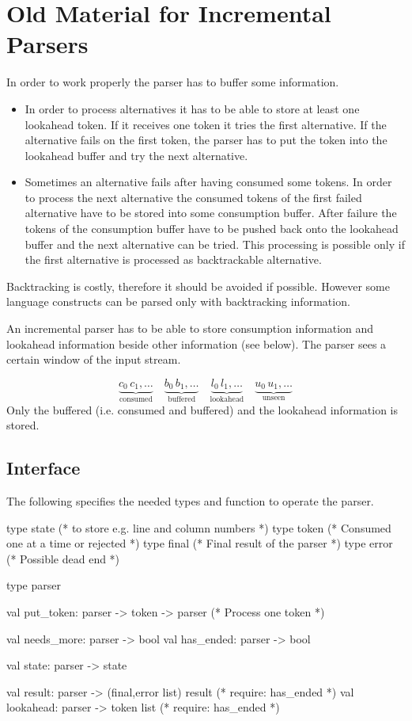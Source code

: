 \section{Old Material for Incremental Parsers}


In order to work properly the parser has to buffer some information.
\begin{itemize}

\item In order to process alternatives it has to be able to store at least one
  lookahead token. If it receives one token it tries the first alternative. If
  the alternative fails on the first token, the parser has to put the token
  into the lookahead buffer and try the next alternative.

\item Sometimes an alternative fails after having consumed some tokens. In
  order to process the next alternative the consumed tokens of the first
  failed alternative have to be stored into some consumption buffer. After
  failure the tokens of the consumption buffer have to be pushed back onto the
  lookahead buffer and the next alternative can be tried. This processing is
  possible only if the first alternative is processed as backtrackable
  alternative.
\end{itemize}

Backtracking is costly, therefore it should be avoided if possible. However
some language constructs can be parsed only with backtracking information.

An incremental parser has to be able to store consumption information and
lookahead information beside other information (see below). The parser sees a
certain window of the input stream.

$$
\underbrace{c_0\,c_1, \ldots}_{\text{consumed}}
\quad
\underbrace{b_0\,b_1, \ldots}_{\text{buffered}}
\quad
\underbrace{l_0\,l_1, \ldots}_{\text{lookahead}}
\quad
\underbrace{u_0\,u_1, \ldots}_{\text{unseen}}
$$
%
Only the buffered (i.e. consumed and buffered) and the lookahead information
is stored.


\subsection{Interface}

The following specifies the needed types and function to operate the parser.
\begin{ocaml}
  type state           (* to store e.g. line and column numbers *)
  type token           (* Consumed one at a time or rejected *)
  type final           (* Final result of the parser *)
  type error           (* Possible dead end *)

  type parser

  val put_token:  parser -> token -> parser  (* Process one token *)

  val needs_more: parser -> bool
  val has_ended:  parser -> bool

  val state:  parser -> state

  val result: parser -> (final,error list) result (* require: has_ended *)
  val lookahead: parser -> token list             (* require: has_ended *)
\end{ocaml}

